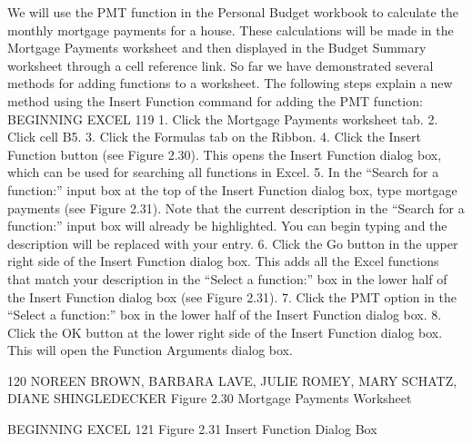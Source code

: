 We will use the PMT function in the Personal Budget workbook to calculate the monthly mortgage
payments for a house. These calculations will be made in the Mortgage Payments worksheet and
then displayed in the Budget Summary worksheet through a cell reference link. So far we have
demonstrated several methods for adding functions to a worksheet. The following steps explain a new
method using the Insert Function command for adding the PMT function:
BEGINNING EXCEL 119
1.   Click the Mortgage Payments worksheet tab.
2.   Click cell B5.
3.   Click the Formulas tab on the Ribbon.
4.   Click the Insert Function button (see Figure 2.30). This opens the Insert Function dialog box,
which can be used for searching all functions in Excel.
5.   In the “Search for a function:” input box at the top of the Insert Function dialog box,
type mortgage payments (see Figure 2.31). Note that the current description in the “Search for
a function:” input box will already be highlighted. You can begin typing and the description will
be replaced with your entry.
6.   Click the Go button in the upper right side of the Insert Function dialog box. This adds all the
Excel functions that match your description in the “Select a function:” box in the lower half of
the Insert Function dialog box (see Figure 2.31).
7.   Click the PMT option in the “Select a function:” box in the lower half of the Insert Function
dialog box.
8.   Click the OK button at the lower right side of the Insert Function dialog box. This will open the
Function Arguments dialog box.




120 NOREEN BROWN, BARBARA LAVE, JULIE ROMEY, MARY SCHATZ, DIANE SHINGLEDECKER
Figure 2.30 Mortgage Payments Worksheet




BEGINNING EXCEL 121
Figure 2.31 Insert Function Dialog Box




